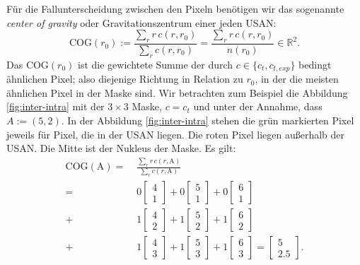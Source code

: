 \documentclass[a4paper, 11pt]{report}
\renewcommand{\emph}[1]{\textit{#1}}
\theoremstyle{definition}
\begin{document}
			Für die Fallunterscheidung zwischen den Pixeln benötigen wir das sogenannte \emph{center of gravity} oder Gravitationszentrum einer jeden USAN:
				$$ \text{COG}(r_0) := \frac	{\sum_r r\,c(r,r_0)} {\sum_r c(r,r_0)} = \frac	{\sum_r r\,c(r,r_0)} {n(r_0)} \in \mathbb{R}^2.$$
			Das $\text{COG}(r_0)$ ist die gewichtete Summe der durch $c \in \{c_t, c_{t,exp}\}$ bedingt ähnlichen Pixel; also diejenige Richtung in Relation zu $r_0$, in der die meisten ähnlichen Pixel in der Maske sind.
			Wir betrachten zum Beispiel die Abbildung \ref{fig:inter-intra} mit der $3\times3$ Maske, $c = c_t$ und unter der Annahme, dass $A := (5,2)$. In der Abbildung \ref{fig:inter-intra} stehen die grün markierten Pixel jeweils für Pixel, die in der USAN liegen. Die roten Pixel liegen außerhalb der USAN. Die Mitte ist der Nukleus der Maske. Es gilt:
			\begin{align*}
				\text{COG}(\text{A})
				= &\;\frac{\sum_r r\,c(r,\text{A})} {\sum_r c(r, \text{A})} \\
				= &\;0\begin{bmatrix}4\\1\end{bmatrix} + 0\begin{bmatrix}5\\1\end{bmatrix} + 0\begin{bmatrix}6\\1\end{bmatrix} \\
				+ &\;1\begin{bmatrix}4\\2\end{bmatrix} + 1\begin{bmatrix}5\\2\end{bmatrix} + 1\begin{bmatrix}6\\2\end{bmatrix} \\
				+ &\;1\begin{bmatrix}4\\3\end{bmatrix} + 1\begin{bmatrix}5\\3\end{bmatrix} + 1\begin{bmatrix}6\\3\end{bmatrix} = \begin{bmatrix}5\\2.5\end{bmatrix}.
			\end{align*}
\end{document}
